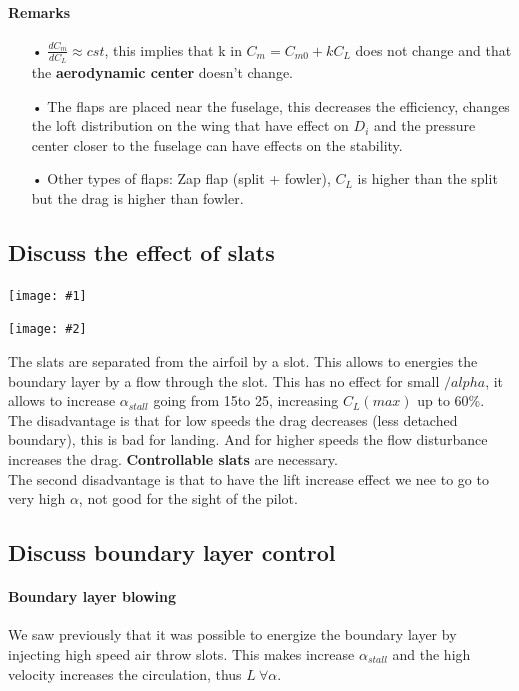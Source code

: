\documentclass[british,french,11pt, a4paper, openany]{article}
\newcommand{\minifig}[6]{
	\begin{center}%
		\begin{minipage}{#5\textwidth}%
			\texttt{[image: \#1]}%
			\captionof{figure}{}%
			\label{#1}%
		\end{minipage}%
		\begin{minipage}{#6\textwidth}%
			\texttt{[image: \#2]}%
			\captionof{figure}{}%
			\label{#2}%
		\end{minipage}%
	\end{center}
}
\begin{document}
\begin{center}
\begin{minipage}{0.3\textwidth}
	\end{minipage}
\end{center}

\paragraph{Remarks}
\begin{itemize}
	\item[•] $\frac{dC_m}{dC_L}\approx cst$, this implies that k in $C_m = C_{m0} + k C_L$ does not change and that the \textbf{aerodynamic center} doesn't change. 
	
	\item[•] The flaps are placed near the fuselage, this decreases the efficiency, changes the loft distribution on the wing that have effect on $D_i$ and the pressure center closer to the fuselage can have effects on the stability. 
	
	\item[•] Other types of flaps: Zap flap (split + fowler), $C_L$ is higher than the split but the drag is higher than fowler. 
\end{itemize}

\subsection{Discuss the effect of slats}
\minifig{ch5/8}{ch5/9}{0.2}{0.15}{0.3}{0.3}
The slats are separated from the airfoil by a slot. This allows to energies the boundary layer by a flow through the slot. This has no effect for small $/alpha$, it allows to increase $\alpha _{stall}$ going from 15\degres to 25\degres, increasing $C_L(max)$ up to 60\%. The disadvantage is that for low speeds the drag decreases (less detached boundary), this is bad for landing. And for higher speeds the flow disturbance increases the drag. \textbf{Controllable slats} are necessary. \\

The second disadvantage is that to have the lift increase effect we nee to go to very high $\alpha$, not good for the sight of the pilot. 

\subsection{Discuss boundary layer control}	
\paragraph{Boundary layer blowing}
We saw previously that it was possible to energize the boundary layer by injecting high speed air throw slots. This makes increase $\alpha _{stall}$ and the high velocity increases the circulation, thus $L \ \forall \alpha$. 
\end{document}
